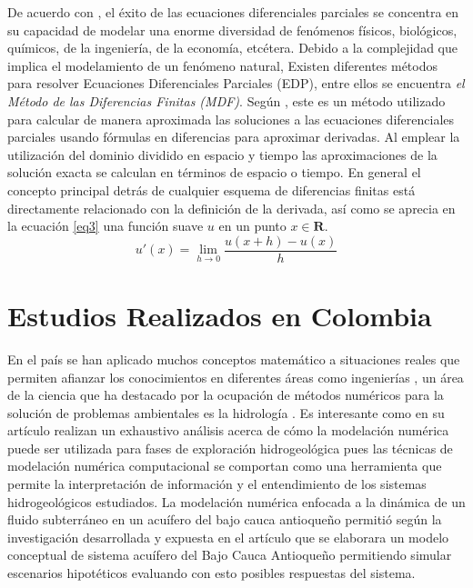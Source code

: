 De acuerdo con \parencite{garza2013ecuaciones}, el éxito de las ecuaciones diferenciales parciales se concentra en su capacidad de modelar una enorme diversidad de fenómenos físicos, biológicos, químicos, de la ingeniería, de la economía, etcétera. Debido a la complejidad que implica el modelamiento de un fenómeno natural, Existen diferentes métodos para resolver Ecuaciones Diferenciales Parciales (EDP), entre ellos se encuentra \textit{el Método de las Diferencias Finitas (MDF)}. Según \parencite{munozsimulacion}, este es un método utilizado para calcular de manera aproximada las soluciones a las ecuaciones diferenciales parciales usando fórmulas en diferencias para aproximar derivadas. Al emplear la utilización del dominio dividido en espacio y tiempo las aproximaciones de la solución exacta se calculan en términos de espacio o tiempo. En general el concepto principal detrás de cualquier esquema de diferencias finitas está directamente relacionado con la definición de la derivada, así como se aprecia en la ecuación \eqref{eq3} una función suave $u$ en un punto $x\in \textbf{R}$.
\begin{equation}
	u'(x)= \displaystyle\lim_{h \to{0}}{\frac{u(x+h)-u(x)}{h}}
	\label{eq3}
\end{equation}
 





\section {Estudios Realizados en Colombia}

En el país se han aplicado muchos conceptos matemático a situaciones reales que permiten afianzar los conocimientos en diferentes áreas como ingenierías , un área de la ciencia que ha destacado por la ocupación de métodos numéricos para la solución de problemas ambientales es la hidrología . Es interesante como   \parencite{betancur2009modelacion}  en su artículo realizan un exhaustivo análisis acerca de cómo la modelación numérica puede ser utilizada para fases de exploración hidrogeológica  pues las técnicas de modelación numérica computacional se comportan como una herramienta que permite la interpretación de información y el entendimiento de los sistemas hidrogeológicos estudiados. La modelación numérica enfocada a la dinámica de un fluido subterráneo en un acuífero del bajo cauca antioqueño permitió según la investigación desarrollada y expuesta en el artículo que se elaborara un modelo conceptual de sistema acuífero del Bajo Cauca Antioqueño
permitiendo simular escenarios hipotéticos evaluando con esto posibles respuestas del sistema. \\

